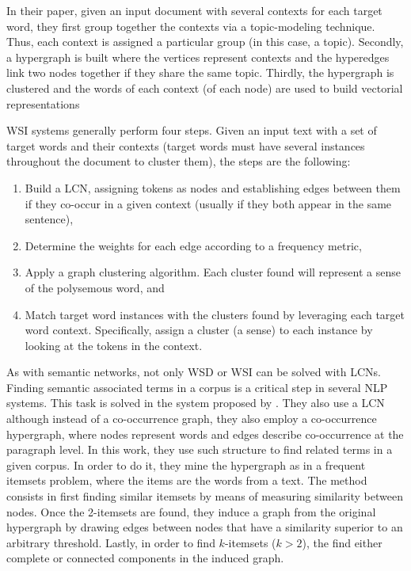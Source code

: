In their paper, given an input document with several contexts for each target word, they first group together the contexts via a topic-modeling technique. Thus, each context is assigned a particular group (in this case, a topic). Secondly, a hypergraph is built where the vertices represent contexts and the hyperedges link two nodes together if they share the same topic. Thirdly, the hypergraph is clustered and the words of each context (of each node) are used to build vectorial representations

WSI systems generally perform four steps. Given an input text with a set of target words and their contexts (target words must have several instances throughout the document to cluster them), the steps are the following:

\begin{enumerate}
\item Build a LCN, assigning tokens as nodes and  establishing edges between them if they co-occur in a given context (usually if they both appear in the same sentence),
\item Determine the weights for each edge according to a frequency metric,
\item Apply a graph clustering algorithm. Each cluster found will represent a sense of the polysemous word, and
\item Match  target word instances with the clusters found by leveraging each target word context. Specifically, assign a cluster (a sense) to each instance by looking at the tokens in the context.
\end{enumerate}

As with semantic networks, not only WSD or WSI can be solved with LCNs. Finding semantic associated terms in a corpus is a critical step in several NLP systems. This task is solved in the system proposed by \cite{2011.Haishan.AHypergraphbased}. They also use a LCN although instead of a co-occurrence graph, they also employ a co-occurrence hypergraph, where nodes represent words and edges describe co-occurrence at the paragraph level.  In this work, they use such structure to find related terms in a given corpus. In order to do it, they mine the hypergraph as in a frequent itemsets problem, where the items are the words from a text. The method consists in first finding similar itemsets by means of measuring similarity between nodes. Once the 2-itemsets are found, they induce a graph from the original hypergraph by drawing edges between nodes that have a similarity superior to an arbitrary threshold. Lastly, in order to find $k$-itemsets ($k > 2$), the find either complete or connected components in the induced graph. 



